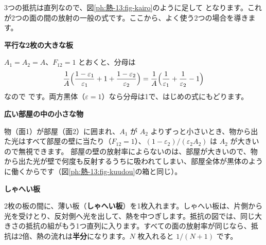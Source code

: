 3つの抵抗は直列なので、図\ref{ph:熱-13:fig-kairo}のように足して
となります。これが2つの面の間の放射の一般の式です。ここから、よく使う2つの場合を導きます。

\noindent\textbf{平行な2枚の大きな板}\par\nobreak
$A_1=A_2=A$、$F_{12}=1$ とおくと、分母は
\[ \frac{1}{A}\Bigl(\frac{1-\varepsilon_1}{\varepsilon_1}+1+\frac{1-\varepsilon_2}{\varepsilon_2}\Bigr)=\frac{1}{A}\Bigl(\frac{1}{\varepsilon_1}+\frac{1}{\varepsilon_2}-1\Bigr) \]
なので
\label{ph:熱-13:heikou}です。両方黒体（$\varepsilon=1$）なら分母は1で、はじめの式にもどります。

\noindent\textbf{広い部屋の中の小さな物}\par\nobreak
物（面1）が部屋（面2）に囲まれ、$A_1$ が $A_2$ よりずっと小さいとき、物から出た光はすべて部屋の壁に当たり（$F_{12}=1$）、$(1-\varepsilon_2)/(\varepsilon_2A_2)$ は $A_2$ が大きいので無視できます。
\label{ph:熱-13:chiisai}部屋の壁の放射率によらないのは、部屋が大きいので、物から出た光が壁で何度も反射するうちに吸われてしまい、部屋全体が黒体のように働くからです（図\ref{ph:熱-13:fig-kuudou}の箱と同じ）。

\begin{phflow}[2つの面の間の放射]
\end{phflow}

\noindent\textbf{しゃへい板}\par\nobreak
2枚の板の間に、薄い板（\textbf{しゃへい板}）を1枚入れます。しゃへい板は、片側から光を受けとり、反対側へ光を出して、熱を中つぎします。抵抗の図では、同じ大きさの抵抗の組がもう1つ直列に入ります。すべての面の放射率が同じなら、抵抗は2倍、熱の流れは\textbf{半分}になります。$N$ 枚入れると $1/(N+1)$ です。

